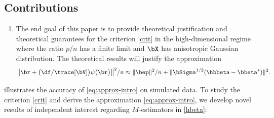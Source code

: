 \documentclass{colt2022} %
\numberwithin{equation}{section}
\begin{document}
\subsection{Contributions}
\begin{enumerate}[leftmargin=0.5cm]
    \item
The end goal of this paper is to provide theoretical justification and 
theoretical guarantees for the criterion
\eqref{crit} in the high-dimensional regime 
    where the ratio $p/n$ has a finite limit 
    and $\bX$ has anisotropic Gaussian distribution.
The theoretical results will justify the approximation
\begin{equation}
\big\| \br + 
\bigl(\df/\trace[\bV]\bigr)
\psi\bigl(\br\bigr)\big\|^2/n
\approx
\|\bep\|^2/n
+
\|\bSigma^{1/2}(\hbbeta-\bbeta^*)\|^2.
\label{eq:approx-intro}
\end{equation}
\end{enumerate}
 illustrates the accuracy
of \eqref{eq:approx-intro} on simulated data.
To study the criterion \eqref{crit} and derive the %
approximation \eqref{eq:approx-intro},
we develop novel results of independent interest regarding
$M$-estimators in \eqref{hbeta}:
\end{document}
